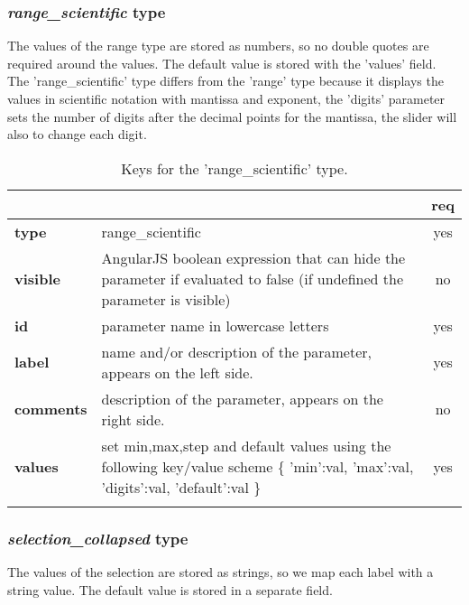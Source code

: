 \subsubsection{ \emph{range\_scientific} type}

The values of the range type are stored as numbers, so no double quotes are 
required around the values. The default value is stored with the 'values' field.
The 'range\_scientific' type differs from the 'range' type because it displays
the values in scientific notation with mantissa and exponent, the 'digits' parameter
sets the number of digits after the decimal points for the mantissa, the slider
will also to change each digit.

\begin{longtable}{|>{\bf}L{\linewidth}|L{\linewidth}|c|}
\hline
      &  & {\bf req} 
\tabularnewline \hline \hline
 type  & range\_scientific       & yes \\ \hline
 visible  & AngularJS boolean expression that can hide the parameter if
            evaluated to false (if undefined the parameter is visible)& no \\ \hline
 id     & parameter name in lowercase letters  & yes \\ \hline
 label  & name and/or description of the parameter, appears on the left side. & yes
                      \\ \hline
 comments & description of the parameter, appears on the right side. & no
                      \\ \hline
 values & set min,max,step and default values using the following key/value 
scheme \{ 'min':val, 'max':val, 'digits':val, 'default':val \} & yes
                      \\ \hline
\caption{Keys for the 'range\_scientific' type.}
\end{longtable}


\subsubsection{ \emph{selection\_collapsed} type}

The values of the selection are stored as strings, so we map each label with a 
string value. The default value is stored in a separate field.

